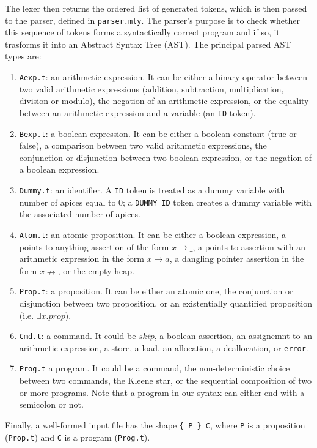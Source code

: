 \documentclass[parskip=half]{scrartcl}
\begin{document}
The lexer then returns the ordered list of generated tokens, which is then passed to the parser, defined in \texttt{parser.mly}.
The parser's purpose is to check whether this sequence of tokens forms a syntactically correct program and if so, it trasforms it into an Abstract Syntax Tree (AST).
The principal parsed AST types are:

\begin{enumerate}
  \item \texttt{Aexp.t}: an arithmetic expression. It can be either a binary operator between two valid arithmetic expressions (addition, subtraction, multiplication, division or modulo), the negation of an arithmetic expression, or the equality between an arithmetic expression and a variable (an \texttt{ID} token).

  \item \texttt{Bexp.t}: a boolean expression. It can be either a boolean constant (true or false), a comparison between two valid arithmetic expressions, the conjunction or disjunction between two boolean expression, or the negation of a boolean expression.

  \item \texttt{Dummy.t}: an identifier. A \texttt{ID} token is treated as a dummy variable with number of apices equal to 0; a \texttt{DUMMY\_ID} token creates a dummy variable with the associated number of apices.
  
  \item \texttt{Atom.t}: an atomic proposition. It can be either a boolean expression, a points-to-anything assertion of the form $x \rightarrow \_$, a points-to assertion with an arithmetic expression in the form $x \rightarrow a$, a dangling pointer assertion in the form $x \nrightarrow$, or the empty heap.
  
  \item \texttt{Prop.t}: a proposition. It can be either an atomic one, the conjunction or disjunction between two proposition, or an existentially quantified proposition (i.e. $\exists x. prop$).
  
  \item \texttt{Cmd.t}: a command. It could be $skip$, a boolean assertion, an assignemnt to an arithmetic expression, a store, a load, an allocation, a deallocation, or \texttt{error}.
  
  \item \texttt{Prog.t} a program. It could be a command, the non-deterministic choice between two commands, the Kleene star, or the sequential composition of two or more programs. Note that a program in our syntax can either end with a semicolon or not.
\end{enumerate}
Finally, a well-formed input file has the shape \verb|{ P } C|, where \texttt{P} is a proposition (\texttt{Prop.t}) and \texttt{C} is a program (\texttt{Prog.t}).
\end{document}
